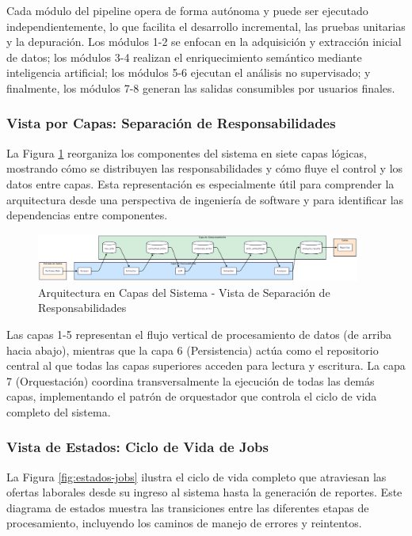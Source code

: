 Cada módulo del pipeline opera de forma autónoma y puede ser ejecutado independientemente, lo que facilita el desarrollo incremental, las pruebas unitarias y la depuración. Los módulos 1-2 se enfocan en la adquisición y extracción inicial de datos; los módulos 3-4 realizan el enriquecimiento semántico mediante inteligencia artificial; los módulos 5-6 ejecutan el análisis no supervisado; y finalmente, los módulos 7-8 generan las salidas consumibles por usuarios finales.

\subsubsection{Vista por Capas: Separación de Responsabilidades}

La Figura \ref{fig:arquitectura-capas} reorganiza los componentes del sistema en siete capas lógicas, mostrando cómo se distribuyen las responsabilidades y cómo fluye el control y los datos entre capas. Esta representación es especialmente útil para comprender la arquitectura desde una perspectiva de ingeniería de software y para identificar las dependencias entre componentes.

\begin{figure}[H]
\centering
\includegraphics[width=0.95\textwidth]{diagrams/ArquitecturaHorizontal.png}
\caption{Arquitectura en Capas del Sistema - Vista de Separación de Responsabilidades}
\label{fig:arquitectura-capas}
\end{figure}

Las capas 1-5 representan el flujo vertical de procesamiento de datos (de arriba hacia abajo), mientras que la capa 6 (Persistencia) actúa como el repositorio central al que todas las capas superiores acceden para lectura y escritura. La capa 7 (Orquestación) coordina transversalmente la ejecución de todas las demás capas, implementando el patrón de orquestador que controla el ciclo de vida completo del sistema.

\subsubsection{Vista de Estados: Ciclo de Vida de Jobs}

La Figura \ref{fig:estados-jobs} ilustra el ciclo de vida completo que atraviesan las ofertas laborales desde su ingreso al sistema hasta la generación de reportes. Este diagrama de estados muestra las transiciones entre las diferentes etapas de procesamiento, incluyendo los caminos de manejo de errores y reintentos.

